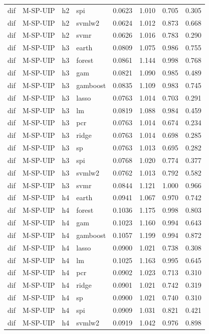 \begin{ThreePartTable}
\begin{longtable}[t]{llclcccc}
dif & M-SP-UIP & h2 & spi & 0.0623 & 1.010 & 0.705 & 0.305\\
dif & M-SP-UIP & h2 & svmlw2 & 0.0624 & 1.012 & 0.873 & 0.668\\
dif & M-SP-UIP & h2 & svmr & 0.0626 & 1.016 & 0.783 & 0.290\\
\addlinespace
dif & M-SP-UIP & h3 & earth & 0.0809 & 1.075 & 0.986 & 0.755\\
dif & M-SP-UIP & h3 & forest & 0.0861 & 1.144 & 0.998 & 0.768\\
dif & M-SP-UIP & h3 & gam & 0.0821 & 1.090 & 0.985 & 0.489\\
dif & M-SP-UIP & h3 & gamboost & 0.0835 & 1.109 & 0.983 & 0.745\\
dif & M-SP-UIP & h3 & lasso & 0.0763 & 1.014 & 0.703 & 0.291\\
dif & M-SP-UIP & h3 & lm & 0.0819 & 1.088 & 0.984 & 0.459\\
dif & M-SP-UIP & h3 & pcr & 0.0763 & 1.014 & 0.674 & 0.234\\
dif & M-SP-UIP & h3 & ridge & 0.0763 & 1.014 & 0.698 & 0.285\\
dif & M-SP-UIP & h3 & sp & 0.0763 & 1.013 & 0.695 & 0.282\\
dif & M-SP-UIP & h3 & spi & 0.0768 & 1.020 & 0.774 & 0.377\\
dif & M-SP-UIP & h3 & svmlw2 & 0.0762 & 1.013 & 0.792 & 0.582\\
dif & M-SP-UIP & h3 & svmr & 0.0844 & 1.121 & 1.000 & 0.966\\
\addlinespace
dif & M-SP-UIP & h4 & earth & 0.0941 & 1.067 & 0.970 & 0.742\\
dif & M-SP-UIP & h4 & forest & 0.1036 & 1.175 & 0.998 & 0.803\\
dif & M-SP-UIP & h4 & gam & 0.1023 & 1.160 & 0.994 & 0.643\\
dif & M-SP-UIP & h4 & gamboost & 0.1057 & 1.199 & 0.994 & 0.872\\
dif & M-SP-UIP & h4 & lasso & 0.0900 & 1.021 & 0.738 & 0.308\\
dif & M-SP-UIP & h4 & lm & 0.1025 & 1.163 & 0.995 & 0.645\\
dif & M-SP-UIP & h4 & pcr & 0.0902 & 1.023 & 0.713 & 0.310\\
dif & M-SP-UIP & h4 & ridge & 0.0901 & 1.021 & 0.742 & 0.319\\
dif & M-SP-UIP & h4 & sp & 0.0900 & 1.021 & 0.740 & 0.310\\
dif & M-SP-UIP & h4 & spi & 0.0909 & 1.031 & 0.821 & 0.421\\
dif & M-SP-UIP & h4 & svmlw2 & 0.0919 & 1.042 & 0.976 & 0.898\\

\end{longtable}
\end{ThreePartTable}
